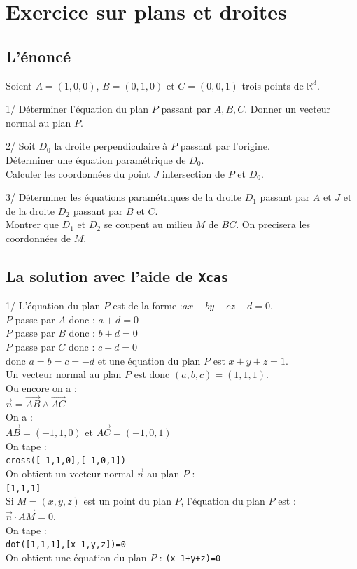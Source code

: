 \documentclass[a4paper,11pt]{book}
\begin{document}
\section{Exercice sur plans et droites}
\subsection{L'\'enonc\'e}
Soient $A=(1,0,0)$, $B=(0,1,0)$ et $C=(0,0,1)$ trois points de $\mathbb R^3$.

1/ D\'eterminer l'\'equation du plan $P$ passant par $A,B,C$.
Donner un vecteur normal au plan $P$.

2/ Soit $D_0$ la droite perpendiculaire \`a $P$ passant par l'origine.\\
D\'eterminer une \'equation param\'etrique de $D_0$.\\
Calculer les coordonn\'ees du point $J$ intersection de $P$ et $D_0$.

3/ D\'eterminer les \'equations param\'etriques de la droite $D_1$ passant par 
$A$ et $J$ et de la droite $D_2$ passant par $B$ et $C$.\\
Montrer que  $D_1$ et $D_2$ se coupent au milieu $M$ de $BC$. On precisera les 
coordonn\'ees de $M$.
\subsection{La solution avec l'aide de {\tt Xcas}}
1/ L'\'equation du plan $P$ est de la forme :$ax+by+cz+d=0$.\\
$P$ passe par $A$ donc : $a+d=0$\\
$P$ passe par $B$ donc : $b+d=0$\\
$P$ passe par $C$ donc : $c+d=0$\\
donc $a=b=c=-d$ et une \'equation du plan $P$ est $x+y+z=1$.\\
Un vecteur normal au plan $P$ est donc $(a,b,c)=(1,1,1)$.\\
Ou encore on a :\\
$\overrightarrow n=\overrightarrow{AB}\wedge\overrightarrow{AC}$\\
On a :\\
$\overrightarrow{AB}=(-1,1,0)$ et $\overrightarrow{AC}=(-1,0,1)$\\
On tape :\\
{\tt cross([-1,1,0],[-1,0,1])}\\
On obtient un vecteur normal $\overrightarrow n$ au plan $P$ :\\
{\tt [1,1,1]}\\
Si $M=(x,y,z)$ est un point du plan $P$, l'\'equation du plan $P$ est :\\
$\overrightarrow n \cdot \overrightarrow{AM}=0$.\\
On tape :\\
{\tt dot([1,1,1],[x-1,y,z])=0}\\
On obtient une \'equation du plan $P$ :
{\tt (x-1+y+z)=0}
\end{document}
